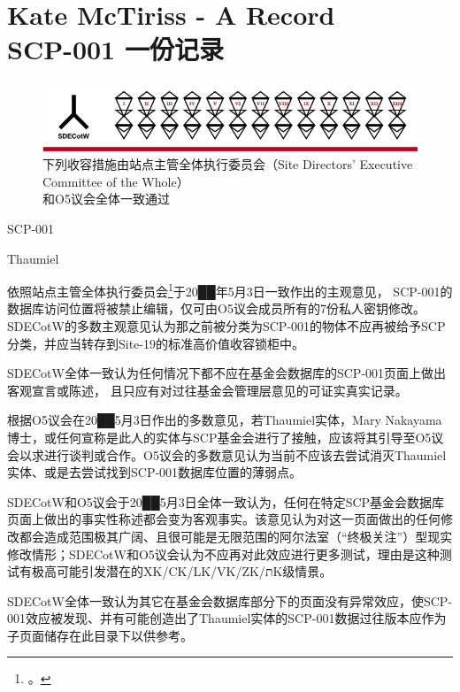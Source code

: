 \chapter[SCP-001 一份记录]{
	Kate McTiriss - A Record \\
	SCP-001 一份记录
}

\label{chap:SCP-001.a.record}

\begin{figure}[H]
	\centering
	\captionsetup{justification=centering}
	\includegraphics[width=\linewidth]{images/SCP.001.a.record.png}
	\caption*{下列收容措施由站点主管全体执行委员会（Site Directors' Executive Committee of the Whole）\\ 和O5议会全体一致通过}
\end{figure}

SCP-001

Thaumiel

依照站点主管全体执行委员会\footnote{。}于20██年5月3日一致作出的主观意见， SCP-001的数据库访问位置将被禁止编辑，仅可由O5议会成员所有的7份私人密钥修改。SDECotW的多数主观意见认为那之前被分类为SCP-001的物体不应再被给予SCP分类，并应当转存到Site-19的标准高价值收容锁柜中。

SDECotW全体一致认为任何情况下都不应在基金会数据库的SCP-001页面上做出客观宣言或陈述， 且只应有对过往基金会管理层意见的可证实真实记录。

根据O5议会在20██5月3日作出的多数意见，若Thaumiel实体，Mary Nakayama博士，或任何宣称是此人的实体与SCP基金会进行了接触，应该将其引导至O5议会以求进行谈判或合作。O5议会的多数意见认为当前不应该去尝试消灭Thaumiel实体、或是去尝试找到SCP-001数据库位置的薄弱点。

SDECotW和O5议会于20██5月3日全体一致认为，任何在特定SCP基金会数据库页面上做出的事实性称述都会变为客观事实。该意见认为对这一页面做出的任何修改都会造成范围极其广阔、且很可能是无限范围的阿尔法室（“终极关注”）型现实修改情形；SDECotW和O5议会认为不应再对此效应进行更多测试，理由是这种测试有极高可能引发潜在的XK/CK/LK/VK/ZK/תK级情景。

SDECotW全体一致认为其它在基金会数据库部分下的页面没有异常效应，使SCP-001效应被发现、并有可能创造出了Thaumiel实体的SCP-001数据过往版本应作为子页面储存在此目录下以供参考。

